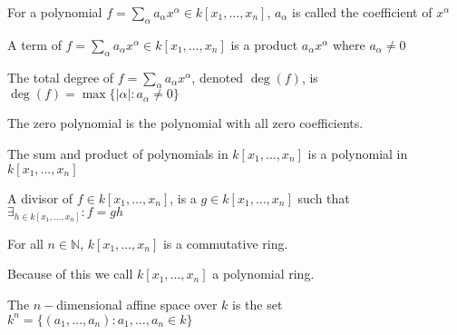                 \begin{definition}
                    For a polynomial
                    $f=\sum_{\alpha}%
                       a_{\alpha}x^{\alpha}%
                       \in{k}[x_1,\hdots ,x_n]$,
                    $a_\alpha$ is called the
                    coefficient of $x^{\alpha}$
                \end{definition}
                \begin{definition}
                    A term of
                    $f=\sum_{\alpha}a_{\alpha}x^{\alpha}%
                       \in k[x_1,\hdots ,x_n]$ is a product
                    $a_{\alpha}x^{\alpha}$ where
                    $a_{\alpha}\ne{0}$
                \end{definition}
                \begin{definition}
                    The total degree of
                    $f=\sum_{\alpha}a_\alpha x^\alpha$,
                    denoted $\deg(f)$, is
                    $\deg(f)=\max\{|\alpha|:a_\alpha\ne{0}\}$
                \end{definition}
                \begin{definition}
                    The zero polynomial is the
                    polynomial with all zero coefficients.
                \end{definition}
                \begin{theorem}
                    The sum and product of polynomials in
                    $k[x_1,\hdots ,x_n]$ is a polynomial
                    in $k[x_1,\hdots,x_n]$
                \end{theorem}
                \begin{definition}
                    A divisor of $f\in k[x_{1},\hdots,x_{n}]$,
                    is a $g\in k[x_{1},\hdots,x_{n}]$ such that
                    $\exists_{h\in k[x_{1},\hdots,x_{n}]}:f=gh$
                \end{definition}
                \begin{theorem}
                    For all $n\in\mathbb{N}$,
                    $k[x_1,\hdots ,x_n]$ is a commutative ring.
                \end{theorem}
                \begin{remark}
                    Because of this we call
                    $k[x_1,\hdots ,x_n]$ a polynomial ring.
                \end{remark}
                \begin{definition}
                    The $n-$dimensional affine space over
                    $k$ is the set
                    $k^{n}%
                     =\{(a_1,\hdots,a_n):a_1,\hdots,a_n \in k\}$
                \end{definition}
